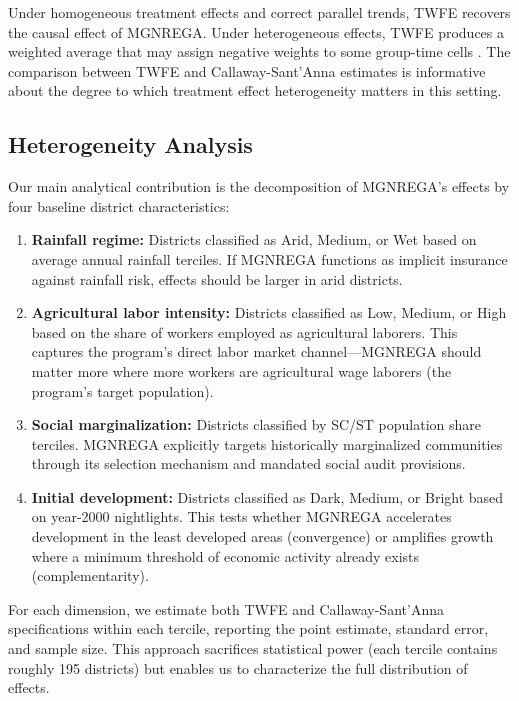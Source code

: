 \documentclass[12pt]{article}
\begin{document}
Under homogeneous treatment effects and correct parallel trends, TWFE recovers the causal effect of MGNREGA. Under heterogeneous effects, TWFE produces a weighted average that may assign negative weights to some group-time cells \citep{dechaisemartin2020two}. The comparison between TWFE and Callaway-Sant'Anna estimates is informative about the degree to which treatment effect heterogeneity matters in this setting.

\subsection{Heterogeneity Analysis}

Our main analytical contribution is the decomposition of MGNREGA's effects by four baseline district characteristics:

\begin{enumerate}
  \item \textbf{Rainfall regime:} Districts classified as Arid, Medium, or Wet based on average annual rainfall terciles. If MGNREGA functions as implicit insurance against rainfall risk, effects should be larger in arid districts.

  \item \textbf{Agricultural labor intensity:} Districts classified as Low, Medium, or High based on the share of workers employed as agricultural laborers. This captures the program's direct labor market channel---MGNREGA should matter more where more workers are agricultural wage laborers (the program's target population).

  \item \textbf{Social marginalization:} Districts classified by SC/ST population share terciles. MGNREGA explicitly targets historically marginalized communities through its selection mechanism and mandated social audit provisions.

  \item \textbf{Initial development:} Districts classified as Dark, Medium, or Bright based on year-2000 nightlights. This tests whether MGNREGA accelerates development in the least developed areas (convergence) or amplifies growth where a minimum threshold of economic activity already exists (complementarity).
\end{enumerate}

For each dimension, we estimate both TWFE and Callaway-Sant'Anna specifications within each tercile, reporting the point estimate, standard error, and sample size. This approach sacrifices statistical power (each tercile contains roughly 195 districts) but enables us to characterize the full distribution of effects.
\end{document}
